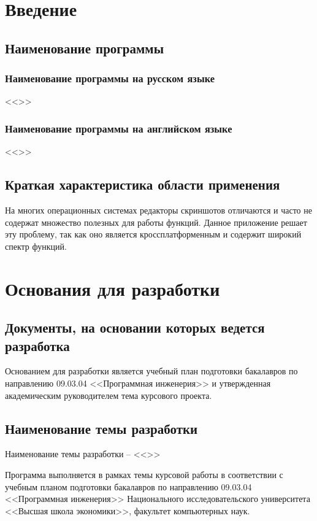 \documentclass[a4paper,12pt,reqno]{article}
\begin{document}
  \CRTpreamble

  \section{Введение}
  \subsection{Наименование программы}
  \subsubsection{Наименование программы на русском языке}
  <<\CRTname>>
  \subsubsection{Наименование программы на английском языке}
  <<\CRTnameeng>>

  \subsection{Краткая характеристика области применения}
  На многих операционных системах редакторы скриншотов отличаются и часто не содержат множество полезных для работы функций.
  Данное приложение решает эту проблему, так как оно является кроссплатформенным и содержит широкий спектр функций.

  \newpage
  \section{Основания для разработки}
  \subsection{Документы, на основании которых ведется разработка}
  Основанием для разработки является учебный план подготовки бакалавров по направлению 09.03.04 <<Программная инженерия>> и утвержденная академическим руководителем тема курсового проекта.

  \subsection{Наименование темы разработки}
  Наименование темы разработки -- <<\CRTname>>

  Программа выполняется в рамках темы курсовой работы в соответствии с учебным планом подготовки бакалавров по направлению 09.03.04 <<Программная инженерия>> Национального исследовательского университета <<Высшая школа экономики>>, факультет компьютерных наук.
\end{document}
